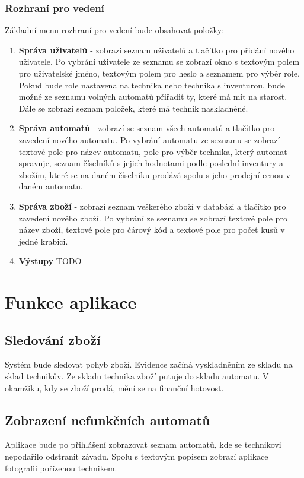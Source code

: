 \documentclass[a4paper,10pt]{article}
\begin{document}
\subsubsection{Rozhraní pro vedení}
Základní menu rozhraní pro vedení bude obsahovat položky:
\begin{enumerate}
	\item \textbf{Správa uživatelů} - zobrazí seznam uživatelů a tlačítko pro přidání nového uživatele. Po vybrání uživatele ze seznamu se zobrazí okno s textovým polem pro uživatelské jméno, textovým polem pro heslo a seznamem pro výběr role. Pokud bude role nastavena na technika nebo technika s inventurou, bude možné ze seznamu volných automatů přiřadit ty, které má mít na starost. Dále se zobrazí seznam položek, které má technik naskladněné.
	\item \textbf{Správa automatů} - zobrazí se seznam všech automatů a tlačítko pro zavedení nového automatu. Po vybrání automatu ze seznamu se zobrazí textové pole pro název automatu, pole pro výběr technika, který automat spravuje, seznam číselníků s jejich hodnotami podle poslední inventury a  zbožím, které se na daném číselníku prodává spolu s jeho prodejní cenou v daném automatu.
	\item \textbf{Správa zboží} - zobrazí seznam veškerého zboží v databázi a tlačítko pro zavedení nového zboží. Po vybrání ze seznamu se zobrazí textové pole pro název zboží, textové pole pro čárový kód a textové pole pro počet kusů v jedné krabici.
	\item \textbf{Výstupy} TODO
\end{enumerate}


\section{Funkce aplikace}
\subsection{Sledování zboží}
Systém bude sledovat pohyb zboží. Evidence začíná vyskladněním ze skladu na sklad technikův. Ze skladu technika zboží putuje do skladu automatu. V okamžiku, kdy se zboží prodá, mění se na finanční hotovost.
\subsection{Zobrazení nefunkčních automatů}
Aplikace bude po přihlášení zobrazovat seznam automatů, kde se technikovi nepodařilo odstranit závadu. Spolu s textovým popisem zobrazí aplikace fotografii pořízenou technikem.
\end{document}
